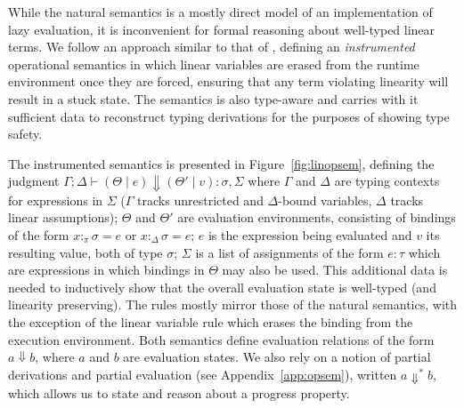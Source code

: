 \documentclass[acmsmall,review,screen]{acmart}
\begin{document}

While the natural semantics is a mostly direct model of an implementation
of lazy evaluation, it is inconvenient for formal reasoning about
well-typed linear terms.
%
We follow an approach
similar to that of \cite{cite:linearhaskell}, defining
an \emph{instrumented} operational semantics in which linear variables are
erased from 
the runtime environment once they are forced, ensuring that any term violating linearity
will result in a stuck state. The semantics is also type-aware and
carries with it sufficient data to reconstruct typing derivations for
the purposes of showing type safety.

The instrumented semantics is presented in
Figure~\ref{fig:linopsem}, defining the judgment $\Gamma ; \Delta \vdash (\Theta \mid e) \Downarrow (\Theta'
\mid v) : \sigma , \Sigma$ where $\Gamma$ and $\Delta$ are typing
contexts for expressions in $\Sigma$
($\Gamma$ tracks unrestricted and $\Delta$-bound variables, $\Delta$ tracks linear
assumptions);
$\Theta$ and $\Theta'$ are evaluation environments, consisting of bindings of the form
$x :_\pi \sigma = e$ or $x :_\Delta \sigma = e$; $e$ is the expression being evaluated and $v$
its resulting value, both of type $\sigma$; $\Sigma$ is a list of assignments of the form
$e : \tau$ which are expressions in which
bindings in $\Theta$ may also be used. This additional data is needed to
inductively show that the overall evaluation state is well-typed (and
linearity preserving). The rules mostly mirror those of the natural
semantics, with the exception of the linear variable rule which erases
the binding from the execution environment. Both semantics define
evaluation relations of the form $a \Downarrow b$, where $a$ and $b$
are evaluation states. We also rely on a notion
of partial derivations and partial evaluation (see
Appendix~\ref{app:opsem}), written $a\Downarrow^* b$, which allows us
to state and reason about a progress property.
\end{document}
